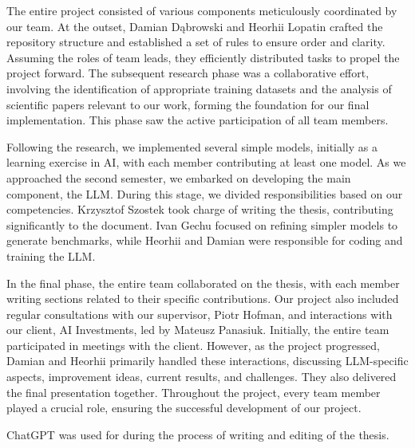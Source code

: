 The entire project consisted of various components meticulously coordinated by our team. At the outset, Damian Dąbrowski and Heorhii Lopatin crafted the repository structure and established a set of rules to ensure order and clarity. Assuming the roles of team leads, they efficiently distributed tasks to propel the project forward. The subsequent research phase was a collaborative effort, involving the identification of appropriate training datasets and the analysis of scientific papers relevant to our work, forming the foundation for our final implementation. This phase saw the active participation of all team members.

Following the research, we implemented several simple models, initially as a learning exercise in AI, with each member contributing at least one model. As we approached the second semester, we embarked on developing the main component, the LLM. During this stage, we divided responsibilities based on our competencies. Krzysztof Szostek took charge of writing the thesis, contributing significantly to the document. Ivan Gechu focused on refining simpler models to generate benchmarks, while Heorhii and Damian were responsible for coding and training the LLM.

In the final phase, the entire team collaborated on the thesis, with each member writing sections related to their specific contributions. Our project also included regular consultations with our supervisor, Piotr Hofman, and interactions with our client, AI Investments, led by Mateusz Panasiuk. Initially, the entire team participated in meetings with the client. However, as the project progressed, Damian and Heorhii primarily handled these interactions, discussing LLM-specific aspects, improvement ideas, current results, and challenges. They also delivered the final presentation together. Throughout the project, every team member played a crucial role, ensuring the successful development of our project.

ChatGPT was used for during the process of writing and editing of the thesis.
